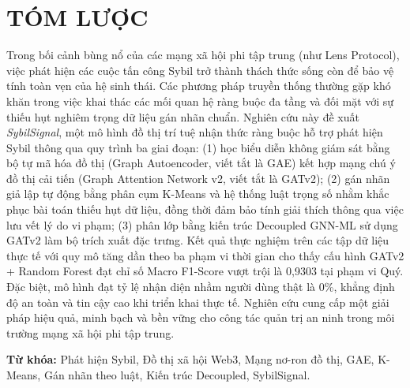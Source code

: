 \chapter{TÓM LƯỢC}

\indent\indent Trong bối cảnh bùng nổ của các mạng xã hội phi tập trung (như Lens Protocol), việc phát hiện các cuộc tấn công Sybil trở thành thách thức sống còn để bảo vệ tính toàn vẹn của hệ sinh thái. Các phương pháp truyền thống thường gặp khó khăn trong việc khai thác các mối quan hệ ràng buộc đa tầng và đối mặt với sự thiếu hụt nghiêm trọng dữ liệu gán nhãn chuẩn. Nghiên cứu này đề xuất \textit{SybilSignal}, một mô hình đồ thị trí tuệ nhận thức ràng buộc hỗ trợ phát hiện Sybil thông qua quy trình ba giai đoạn: (1) học biểu diễn không giám sát bằng bộ tự mã hóa đồ thị (Graph Autoencoder, viết tắt là GAE) kết hợp mạng chú ý đồ thị cải tiến (Graph Attention Network v2, viết tắt là GATv2); (2) gán nhãn giả lập tự động bằng phân cụm K-Means và hệ thống luật trọng số nhằm khắc phục bài toán thiếu hụt dữ liệu, đồng thời đảm bảo tính giải thích thông qua việc lưu vết lý do vi phạm; (3) phân lớp bằng kiến trúc Decoupled GNN-ML sử dụng GATv2 làm bộ trích xuất đặc trưng. Kết quả thực nghiệm trên các tập dữ liệu thực tế với quy mô tăng dần theo ba phạm vi thời gian cho thấy cấu hình GATv2 + Random Forest đạt chỉ số Macro F1-Score vượt trội là 0,9303 tại phạm vi Quý. Đặc biệt, mô hình đạt tỷ lệ nhận diện nhầm người dùng thật là 0\%, khẳng định độ an toàn và tin cậy cao khi triển khai thực tế. Nghiên cứu cung cấp một giải pháp hiệu quả, minh bạch và bền vững cho công tác quản trị an ninh trong môi trường mạng xã hội phi tập trung.\vspace{0.3cm}

\textbf{Từ khóa:} Phát hiện Sybil, Đồ thị xã hội Web3, Mạng nơ-ron đồ thị, GAE, K-Means, Gán nhãn theo luật, Kiến trúc Decoupled, SybilSignal.